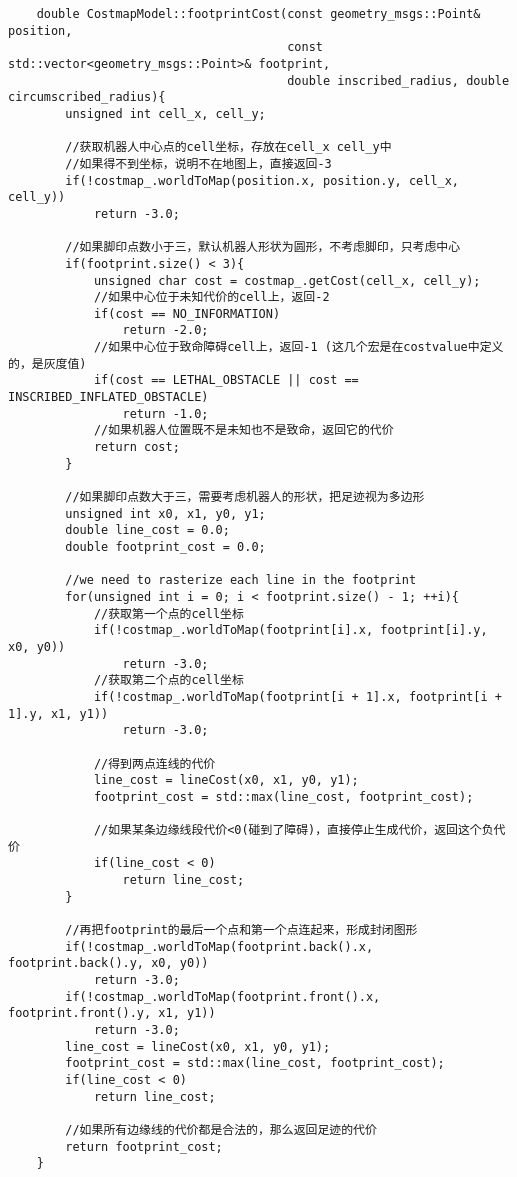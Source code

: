 \documentclass[9pt, oneside]{book}
\begin{document}
\footnotesize
\begin{verbatim}
    double CostmapModel::footprintCost(const geometry_msgs::Point& position, 
                                       const std::vector<geometry_msgs::Point>& footprint,
                                       double inscribed_radius, double circumscribed_radius){
        unsigned int cell_x, cell_y;

        //获取机器人中心点的cell坐标，存放在cell_x cell_y中
        //如果得不到坐标，说明不在地图上，直接返回-3
        if(!costmap_.worldToMap(position.x, position.y, cell_x, cell_y))
            return -3.0;

        //如果脚印点数小于三，默认机器人形状为圆形，不考虑脚印，只考虑中心
        if(footprint.size() < 3){
            unsigned char cost = costmap_.getCost(cell_x, cell_y);
            //如果中心位于未知代价的cell上，返回-2
            if(cost == NO_INFORMATION)
                return -2.0;
            //如果中心位于致命障碍cell上，返回-1 (这几个宏是在costvalue中定义的，是灰度值)
            if(cost == LETHAL_OBSTACLE || cost == INSCRIBED_INFLATED_OBSTACLE)
                return -1.0;
            //如果机器人位置既不是未知也不是致命，返回它的代价
            return cost;
        }

        //如果脚印点数大于三，需要考虑机器人的形状，把足迹视为多边形
        unsigned int x0, x1, y0, y1;
        double line_cost = 0.0;
        double footprint_cost = 0.0;

        //we need to rasterize each line in the footprint
        for(unsigned int i = 0; i < footprint.size() - 1; ++i){
            //获取第一个点的cell坐标
            if(!costmap_.worldToMap(footprint[i].x, footprint[i].y, x0, y0))
                return -3.0;
            //获取第二个点的cell坐标
            if(!costmap_.worldToMap(footprint[i + 1].x, footprint[i + 1].y, x1, y1))
                return -3.0;

            //得到两点连线的代价
            line_cost = lineCost(x0, x1, y0, y1);
            footprint_cost = std::max(line_cost, footprint_cost);

            //如果某条边缘线段代价<0(碰到了障碍)，直接停止生成代价，返回这个负代价
            if(line_cost < 0)
                return line_cost;
        }

        //再把footprint的最后一个点和第一个点连起来，形成封闭图形
        if(!costmap_.worldToMap(footprint.back().x, footprint.back().y, x0, y0))
            return -3.0;
        if(!costmap_.worldToMap(footprint.front().x, footprint.front().y, x1, y1))
            return -3.0;
        line_cost = lineCost(x0, x1, y0, y1);
        footprint_cost = std::max(line_cost, footprint_cost);
        if(line_cost < 0)
            return line_cost;

        //如果所有边缘线的代价都是合法的，那么返回足迹的代价
        return footprint_cost;
    }
\end{verbatim}
\normalsize
\end{document}
